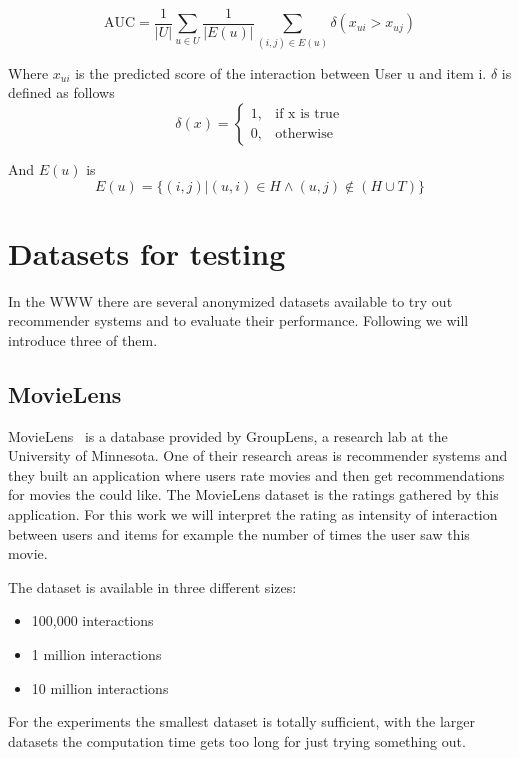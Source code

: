 \begin{equation}
\text{AUC}=\frac{1}{|U|}\sum_{u \in U} \frac{1}{|E(u)|} \sum_{(i,j) \in E(u)} \delta(x_{ui}>x_{uj})
\end{equation}

Where \(x_{ui}\) is the predicted score of the interaction between User u and item i.
\(\delta\) is defined as follows
\begin{equation}
\delta(x)=\begin{cases}1, & \text{if x is true} \\
                       0, & \text{otherwise}
\end{cases}
\end{equation}

And \(E(u)\) is 
\begin{equation}
E(u) =\{(i,j)|(u,i) \in H \land (u,j) \not\in (H \cup T)\}
\end{equation}


\section{Datasets for testing}

In the WWW there are several anonymized datasets available to try
out recommender systems and to evaluate their performance. 
Following we will introduce three of them.


\subsection{MovieLens}
\label{movielens}

MovieLens~\cite{movielensdatasets} is a database provided by GroupLens, a research
lab at the University of Minnesota. One of their research areas is
recommender systems and they built an application where users rate
movies and then get recommendations for movies the could like. The
MovieLens dataset is the ratings gathered by this application. For
this work we will interpret the rating as intensity of interaction
between users and items for example the number of times the user saw
this movie.

The dataset is available in three different sizes:
\begin{itemize}
\item 100,000 interactions
\item 1 million interactions
\item 10 million interactions
\end{itemize}
For the experiments the smallest dataset is totally sufficient, with
the larger datasets the computation time gets too long for just trying
something out.


